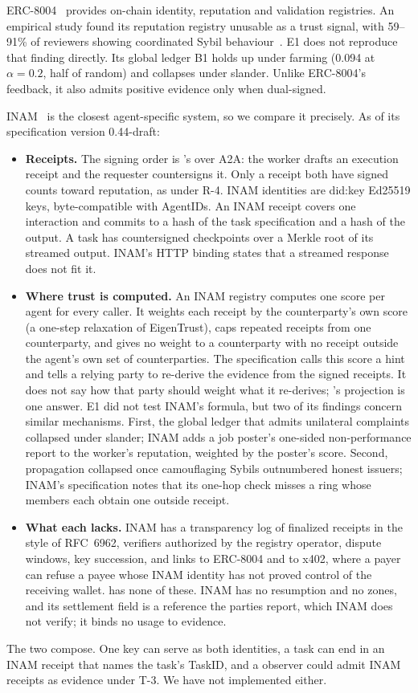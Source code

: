 ERC-8004~\cite{erc8004} provides on-chain identity, reputation and
validation registries. An empirical study found its reputation registry
unusable as a trust signal, with 59--91\% of reviewers showing coordinated
Sybil behaviour~\cite{xiong2026erc8004}. E1 does not reproduce that finding
directly. Its global ledger B1 holds up under farming (0.094 at
$\alpha{=}0.2$, half of random) and collapses under slander. Unlike
ERC-8004's feedback, it also admits positive evidence only when
dual-signed.

INAM~\cite{inam} is the closest agent-specific system, so we compare it
precisely. As of its specification version 0.44-draft:
\begin{itemize}
\item \textbf{Receipts.} The signing order is \sys{}'s over A2A: the
  worker drafts an execution receipt and the requester countersigns it.
  Only a receipt both have signed counts toward reputation, as under R-4.
  INAM identities are did:key Ed25519 keys, byte-compatible with
  AgentIDs. An INAM receipt covers one interaction and commits to a hash
  of the task specification and a hash of the output. A \sys{} task has
  countersigned checkpoints over a Merkle root of its streamed output.
  INAM's HTTP binding states that a streamed response does not fit it.
\item \textbf{Where trust is computed.} An INAM registry computes one
  score per agent for every caller. It weights each receipt by the
  counterparty's own score (a one-step relaxation of EigenTrust), caps
  repeated receipts from one counterparty, and gives no weight to a
  counterparty with no receipt outside the agent's own set of
  counterparties. The specification calls this score a hint and tells a
  relying party to re-derive the evidence from the signed receipts. It
  does not say how that party should weight what it re-derives;
  \sys{}'s projection is one answer. E1 did not test INAM's formula, but
  two of its findings concern similar mechanisms. First, the global
  ledger that admits unilateral complaints collapsed under slander; INAM
  adds a job poster's one-sided non-performance report to the worker's
  reputation, weighted by the poster's score. Second, propagation
  collapsed once camouflaging Sybils outnumbered honest issuers; INAM's
  specification notes that its one-hop check misses a ring whose members
  each obtain one outside receipt.
\item \textbf{What each lacks.} INAM has a transparency log of finalized
  receipts in the style of RFC~6962, verifiers authorized by the registry
  operator, dispute windows, key succession, and links to ERC-8004 and
  to x402, where a payer can refuse a payee whose INAM identity has not
  proved control of the receiving wallet. \sys{} has none of these. INAM
  has no resumption and no zones, and its settlement field is a reference
  the parties report, which INAM does not verify; it binds no usage to
  evidence.
\end{itemize}
The two compose. One key can serve as both identities, a \sys{} task can
end in an INAM receipt that names the task's TaskID, and a \sys{}
observer could admit INAM receipts as evidence under T-3. We have not
implemented either.

